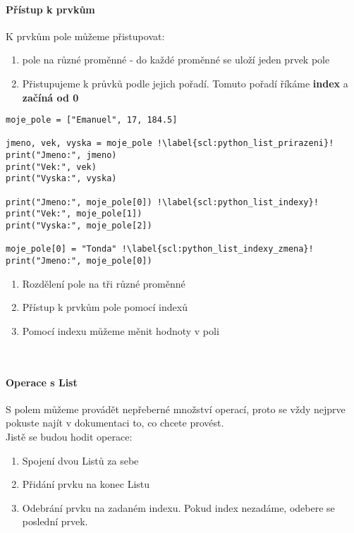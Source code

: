 \paragraph{Přístup k prvkům}
K prvkům pole můžeme přistupovat:
\begin{enumerate}
\item {} pole na různé proměnné - do každé proměnné se uloží jeden prvek pole
\item Přistupujeme k průvků podle jejich pořadí. Tomuto pořadí říkáme \textbf{index} a \textbf{začíná od 0}
\end{enumerate}
  
\begin{minipage}[t]{.45\textwidth}
\begin{code}
\begin{verbatim}
moje_pole = ["Emanuel", 17, 184.5]

jmeno, vek, vyska = moje_pole !\label{scl:python_list_prirazeni}!
print("Jmeno:", jmeno)
print("Vek:", vek)
print("Vyska:", vyska)

print("Jmeno:", moje_pole[0]) !\label{scl:python_list_indexy}!
print("Vek:", moje_pole[1])
print("Vyska:", moje_pole[2])

moje_pole[0] = "Tonda" !\label{scl:python_list_indexy_zmena}!
print("Jmeno:", moje_pole[0])
\end{verbatim}

\label{code:typy_list_elements}
\end{code}
\end{minipage}
\begin{minipage}[t]{.45\textwidth}
\begin{enumerate}
\item[ř. \ref{scl:python_list_prirazeni}:] Rozdělení pole na tři různé proměnné
\item[ř. \ref{scl:python_list_indexy}:] Přístup k prvkům pole pomocí indexů
\item[ř. \ref{scl:python_list_indexy_zmena}:] Pomocí indexu můžeme měnit hodnoty v poli
\end{enumerate}
\end{minipage}\\ 

\paragraph{Operace s List}
S polem můžeme provádět nepřeberné množství operací, proto se vždy nejprve pokuste najít v dokumentaci to, co chcete provést.\\
Jistě se budou hodit operace:
\begin{enumerate}
\item[+] Spojení dvou Listů za sebe
\item[.append()] Přidání prvku na konec Listu
\item[.pop(index)] Odebrání prvku na zadaném indexu. Pokud index nezadáme, odebere se poslední prvek.
\end{enumerate}

